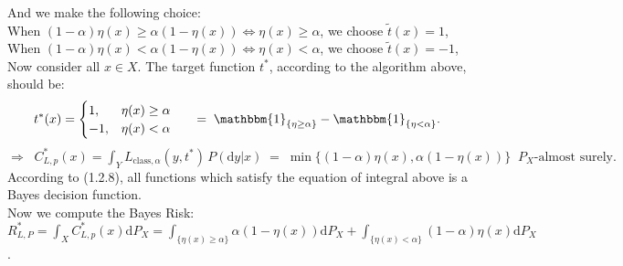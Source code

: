 \documentclass{article}
\begin{document}
And we make the following choice:\\
When $(1-\alpha)\eta(x) \geq \alpha(1-\eta(x)) \Leftrightarrow \eta(x) \geq \alpha$, we choose $\tilde{t}(x) = 1$,\\
When $(1-\alpha)\eta(x) < \alpha(1-\eta(x)) \Leftrightarrow \eta(x) < \alpha$, we choose $\tilde{t}(x) = -1$,\\
Now consider all $x\in X$. The target function $t^*$, according to the algorithm above, should be:
\begin{align*}
t^*(x) = \begin{cases} 1, &\eta(x) \geq \alpha \cr -1, &\eta(x) < \alpha \end{cases} 
\indent = \; \mathbbm{1}_{\{\eta \geq \alpha\}} - \mathbbm{1}_{\{\eta < \alpha\}}.
\end{align*}
$\Rightarrow \;\; C^*_{L,p}(x) = \displaystyle{ \int_{Y}  L_{\text{class},\alpha}(y,t^*)\,  P(\text{d}y|x)} \;=\; \min \{ (1-\alpha)\eta(x), \alpha(1-\eta(x)) \}\;\; P_X\text{-almost surely}.$\\
According to (1.2.8), all functions which satisfy the equation of integral above is a Bayes decision function.\\
Now we compute the Bayes Risk:\\
$R^*_{L,P} =  \displaystyle{ \int_{X} C^*_{L,p}(x) \text{d}P_X = \int_{\{\eta(x)\geq \alpha\}}\alpha(1-\eta(x)) \text{d}P_X + \int_{\{\eta(x) < \alpha\}} (1-\alpha)\eta(x) \text{d}P_X } $.\\
 \\

\newpage
\end{document}
